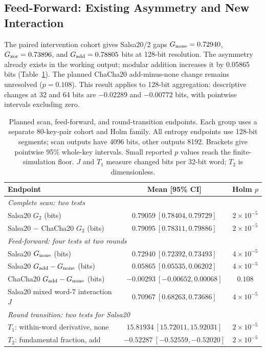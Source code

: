 \documentclass[electronics,article,submit,pdftex,oneauthor]{Definitions/mdpi}
\begin{document}
\subsection{Feed-Forward: Existing Asymmetry and New Interaction}\label{sec:ffresults}

The paired intervention cohort gives Salsa20/2 gaps $G_{\rm none}=0.72940$, $G_{\rm xor}=0.73896$, and $G_{\rm add}=0.78805$ bits at 128-bit resolution. The asymmetry already exists in the working output; modular addition increases it by 0.05865 bits (Table~\ref{tab:primary}). The planned ChaCha20 add-minus-none change remains unresolved ($p=0.108$). This result applies to 128-bit aggregation: descriptive changes at 32 and 64 bits are $-0.02289$ and $-0.00772$ bits, with pointwise intervals excluding zero.

\begin{table}[t]
\caption{Planned scan, feed-forward, and round-transition endpoints. Each group uses a separate 80-key-pair cohort and Holm family. All entropy endpoints use 128-bit segments; scan outputs have 4096 bits, other outputs 8192. Brackets give pointwise 95\% whole-key intervals. Small reported $p$ values reach the finite-simulation floor. $J$ and $T_1$ measure changed bits per 32-bit word; $T_2$ is dimensionless.\label{tab:primary}}
\small\setlength{\tabcolsep}{3pt}
\begin{tabularx}{\textwidth}{Xcc}
\toprule
\textbf{Endpoint} & \textbf{Mean [95\% CI]} & \textbf{Holm $p$}\\
\midrule
\multicolumn{3}{l}{\emph{Complete scan: two tests}}\\
Salsa20 $G_2$ (bits) & $0.79059\ [0.78404,0.79729]$ & $2\times10^{-5}$\\
Salsa20 $-$ ChaCha20 $G_2$ (bits) & $0.79095\ [0.78311,0.79886]$ & $2\times10^{-5}$\\
\midrule
\multicolumn{3}{l}{\emph{Feed-forward: four tests at two rounds}}\\
Salsa20 $G_{\rm none}$ (bits) & $0.72940\ [0.72392,0.73493]$ & $4\times10^{-5}$\\
Salsa20 $G_{\rm add}-G_{\rm none}$ (bits) & $0.05865\ [0.05535,0.06202]$ & $4\times10^{-5}$\\
ChaCha20 $G_{\rm add}-G_{\rm none}$ (bits) & $-0.00293\ [-0.00652,0.00068]$ & $0.108$\\
Salsa20 mixed word-7 interaction $J$ & $0.70967\ [0.68263,0.73686]$ & $4\times10^{-5}$\\
\midrule
\multicolumn{3}{l}{\emph{Round transition: two tests for Salsa20}}\\
$T_1$: within-word derivative, none & $15.81934\ [15.72011,15.92031]$ & $2\times10^{-5}$\\
$T_2$: fundamental fraction, add & $-0.52287\ [-0.52559,-0.52020]$ & $2\times10^{-5}$\\
\bottomrule
\end{tabularx}
\end{table}
\end{document}

